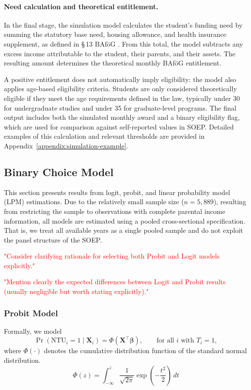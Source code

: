 \paragraph{Need calculation and theoretical entitlement.}
In the final stage, the simulation model calculates the student's funding need by summing the statutory base need, housing allowance, and health insurance supplement, as defined in §\,13 BAföG \citep{bafoeg_law}. 
From this total, the model subtracts any excess income attributable to the student, their parents, and their assets. 
The resulting amount determines the theoretical monthly BAföG entitlement.

A positive entitlement does not automatically imply eligibility: the model also applies age-based eligibility criteria. 
Students are only considered theoretically eligible if they meet the age requirements defined in the law, typically under 30 for undergraduate studies and under 35 for graduate-level programs. 
The final output includes both the simulated monthly award and a binary eligibility flag, which are used for comparison against self-reported values in SOEP. 
Detailed examples of this calculation and relevant thresholds are provided in Appendix~\ref{appendix:simulation-example}.



\subsection{Binary Choice Model}
This section presents results from logit, probit, and linear probability model (LPM) estimations. 
Due to the relatively small sample size (\( n = 5{,}889 \)), resulting from restricting the sample to observations with complete parental income information, all models are estimated using a pooled cross-sectional specification. 
That is, we treat all available years as a single pooled sample and do not exploit the panel structure of the SOEP.

\textcolor{red}{"Consider clarifying rationale for selecting both Probit and Logit models explicitly."}

\textcolor{red}{"Mention clearly the expected differences between Logit and Probit results (usually negligible but worth stating explicitly)."}

\subsubsection{Probit Model}
Formally, we model
\begin{equation}
  \Pr(\mathrm{NTU}_i = 1 \mid \mathbf{X}_i) = \Phi(\mathbf{X}^\top \boldsymbol{\beta})
  , \qquad \text{for all } i \text{ with } T_i = 1,
\end{equation}
where \( \Phi(\cdot) \) denotes the cumulative distribution function of the standard normal distribution. 
\begin{equation}
  \Phi(z) = \int_{-\infty}^{z} \frac{1}{\sqrt{2\pi}} \exp\left( -\frac{t^2}{2} \right) \, dt
\end{equation}

